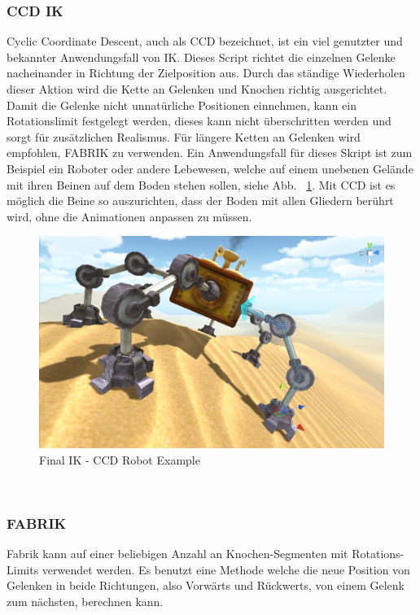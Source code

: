 \begin{itemize}
\subsubsection{CCD IK}
Cyclic Coordinate Descent, auch als CCD bezeichnet, ist ein viel genutzter und bekannter Anwendungsfall von IK.
Dieses Script richtet die einzelnen Gelenke nacheinander in Richtung der Zielposition aus.
Durch das ständige Wiederholen dieser Aktion wird die Kette an Gelenken und Knochen richtig ausgerichtet.
Damit die Gelenke nicht unnatürliche Positionen einnehmen, kann ein Rotationslimit festgelegt werden, dieses kann nicht überschritten werden und sorgt für zusätzlichen Realismus.
Für längere Ketten an Gelenken wird empfohlen, FABRIK zu verwenden.
Ein Anwendungsfall für dieses Skript ist zum Beispiel ein Roboter oder andere Lebewesen, welche auf einem unebenen Gelände mit ihren Beinen auf dem Boden stehen sollen, siehe Abb. ~\ref{fig:finalIK_ccd_robot_example}.
Mit CCD ist es möglich die Beine so auszurichten, dass der Boden mit allen Gliedern berührt wird, ohne die Animationen anpassen zu müssen.
\begin {figure}
    \centering
    \includegraphics[scale=0.4]{pics/finalik_ccd}
    \caption{Final IK - CCD Robot Example}
    \label{fig:finalIK_ccd_robot_example}
\end {figure}
~\cite{FinalIK_CCD_2021}

\subsubsection{FABRIK}
Fabrik kann auf einer beliebigen Anzahl an Knochen-Segmenten mit Rotations-Limits verwendet werden.
Es benutzt eine Methode welche die neue Position von Gelenken in beide Richtungen, also Vorwärts und Rückwerts,
von einem Gelenk zum nächsten, berechnen kann.


\end{itemize}
